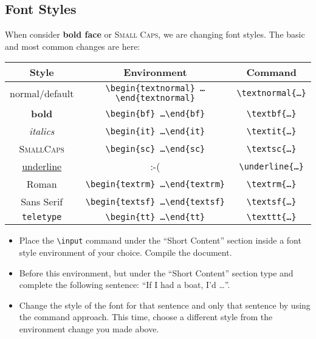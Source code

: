\subsection*{Font Styles}
When consider \textbf{bold face} or \textsc{Small Caps}, we are
changing font styles. The basic and most common changes are here:
\begin{small}
\begin{center}
  \begin{tabular}{c c c}
    \hline
    Style               & Environment                                                                          & Command \\
    \hline
    normal/default      & \texttt{\textbackslash begin\{textnormal\} \ldots \textbackslash end\{textnormal\}}  & \texttt{\textbackslash textnormal\{\ldots \}}\\
   \textbf{bold}        & \texttt{\textbackslash begin\{bf\} \ldots \textbackslash end\{bf\}}  & \texttt{\textbackslash textbf\{\ldots \}}\\
   \textit{italics}     & \texttt{\textbackslash begin\{it\} \ldots \textbackslash end\{it\}}  & \texttt{\textbackslash textit\{\ldots \}}\\
   \textsc{SmallCaps}   & \texttt{\textbackslash begin\{sc\} \ldots \textbackslash end\{sc\}}  & \texttt{\textbackslash textsc\{\ldots \}}\\
   \underline{underline}&                                      :-(                             & \texttt{\textbackslash underline\{\ldots \}}\\
   \textrm{Roman}       & \texttt{\textbackslash begin\{textrm\} \ldots \textbackslash end\{textrm\}}  & \texttt{\textbackslash textrm\{\ldots \}}\\
   \textsf{Sans Serif}  & \texttt{\textbackslash begin\{textsf\} \ldots \textbackslash end\{textsf\}}  & \texttt{\textbackslash textsf\{\ldots \}}\\
   \texttt{teletype}    & \texttt{\textbackslash begin\{tt\} \ldots \textbackslash end\{tt\}}  & \texttt{\textbackslash texttt\{\ldots \}}\\
   \hline
  \end{tabular}
\end{center}
\end{small}
\begin{itemize}
\item Place the \texttt{\textbackslash input} command under the ``Short Content''
  section inside a font style environment of your choice. Compile the
  document.
\item Before this environment, but under the ``Short Content'' section
  type and complete the following sentence: ``If I had a boat, I'd \ldots''.
\item Change the style of the font for that sentence and only that
  sentence by using the command approach. This time, choose a
  different style from the environment change you made above.
\end{itemize}



